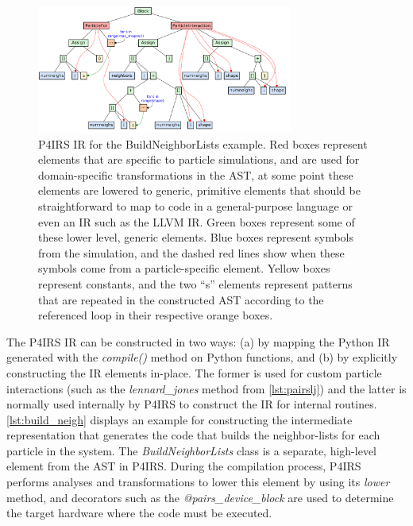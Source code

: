 \documentclass[Afour,sageh,times]{sagej}
\newcommand{\RMchange}[1]{{\color{blue} #1}}
\begin{document}
\begin{figure}[htb]
  \centering
  \includegraphics[width=0.75\textwidth]{pairs_ir.pdf}
  \caption{\RMchange{P4IRS IR for the BuildNeighborLists example. Red boxes represent elements that are specific to particle simulations, and are used for domain-specific transformations in the \ac{AST}, at some point these elements are lowered to generic, primitive elements that should be straightforward to map to code in a general-purpose language or even an IR such as the LLVM IR. Green boxes represent some of these lower level, generic elements. Blue boxes represent symbols from the simulation, and the dashed red lines show when these symbols come from a particle-specific element. Yellow boxes represent constants, and the two ``s'' elements represent patterns that are repeated in the constructed \ac{AST} according to the referenced loop in their respective orange boxes.}}
  \label{fig:pairs_ir}
\end{figure}


\RMchange{The P4IRS IR can be constructed in two ways: (a) by mapping the Python IR generated with the \emph{compile()} method on Python functions, and (b) by explicitly constructing the IR elements in-place.
The former is used for custom particle interactions (such as the \emph{lennard\_jones} method from \autoref{lst:pairslj}) and the latter is normally used internally by P4IRS to construct the IR for internal routines.}
\autoref{lst:build_neigh} displays an example for constructing the intermediate representation that generates the code that builds the neighbor-lists for each particle in the system.
The \emph{BuildNeighborLists} class is a separate, high-level element from the AST in P4IRS.
During the compilation process, P4IRS performs analyses and transformations to lower this element by using its \emph{lower} method, and decorators such as the \emph{@pairs\_device\_block} are used to determine the target hardware where the code must be executed.
\end{document}
